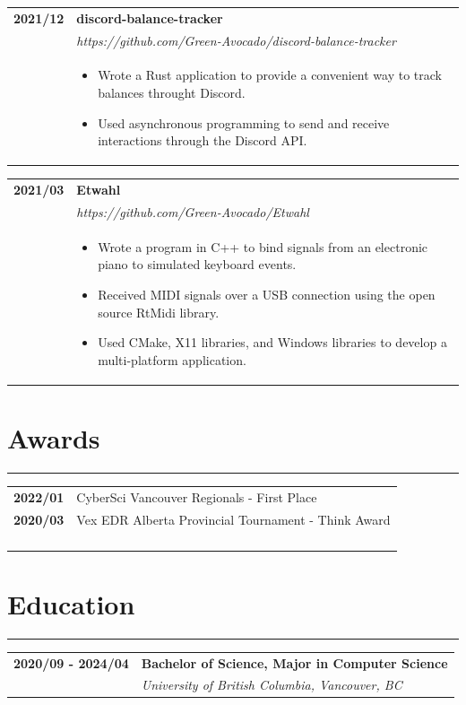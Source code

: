 \documentclass[letterpaper]{article}
\newcommand{\sect}[1]{\section*{#1}
                        {\color{cyan}
                        \rule{\textwidth}{1pt}
                        \vspace{-1ex}}}
\begin{document}
        \begin{tabular}{p{} p{}}
            \textbf{2021/12} & \textbf{discord-balance-tracker} \\
            & \emph{https://github.com/Green-Avocado/discord-balance-tracker} \\
            & \begin{itemize}
                \item Wrote a Rust application to provide a convenient way to track balances throught
                    Discord.
                \item Used asynchronous programming to send and receive interactions through the Discord
                    API.
            \end{itemize}
        \end{tabular}

        \begin{tabular}{p{} p{}}
            \textbf{2021/03} & \textbf{Etwahl} \\
            & \emph{https://github.com/Green-Avocado/Etwahl} \\
            & \begin{itemize}
                \item Wrote a program in C++ to bind signals from an electronic piano to simulated
                    keyboard events.
                \item Received MIDI signals over a USB connection using the open source RtMidi library.
                \item Used CMake, X11 libraries, and Windows libraries to develop a multi-platform
                    application.
            \end{itemize}
        \end{tabular}

    \sect{Awards}

        \begin{tabular}{p{} p{}}
            \textbf{2022/01} & CyberSci Vancouver Regionals - First Place \\
            \textbf{2020/03} & Vex EDR Alberta Provincial Tournament - Think Award \\

            \\\\\\\\
        \end{tabular}

    \sect{Education}

        \begin{tabular}{p{} p{}}
            \textbf{2020/09 - 2024/04} & \large\textbf{Bachelor of Science, Major in Computer Science} \\
            & \emph{University of British Columbia, Vancouver, BC} \\
        \end{tabular}
\end{document}
